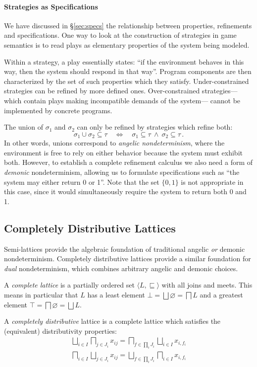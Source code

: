 \documentclass[sigplan,10pt,authordraft]{acmart}
\begin{document}
\paragraph{Strategies as Specifications}

We have discussed in \S\ref{sec:specs}
the relationship between
properties, refinements and specifications.
One way to look at the construction of strategies
in game semantics
is to read plays as elementary properties
of the system being modeled.

Within a strategy,
a play essentially states:
``if the environment behaves in this way,
then the system should respond in that way''.
Program components are then characterized by
the set of such properties which they satisfy.
Under-constrained strategies can be refined by
more defined ones.
Over-constrained strategies---%
which contain plays
making incompatible demands of the system---%
cannot be implemented by concrete programs.

The union of $\sigma_1$ and $\sigma_2$
can only be refined by strategies which refine both:
\[
  \sigma_1 \cup \sigma_2 \subseteq \tau
  \quad\Leftrightarrow\quad
  \sigma_1 \subseteq \tau \:\wedge\:
  \sigma_2 \subseteq \tau
  \,.
\]
In other words,
unions correspond to \emph{angelic nondeterminism},
where the environment is free to rely on either behavior
because the system must exhibit both.
However,
to establish a complete refinement calculus
we also need a form of \emph{demonic} nondeterminism,
allowing us to formulate specifications such as
``the system may either return 0 or 1''.
Note that the set $\{0, 1\}$ is not appropriate in this case,
since it would simultaneously require the system
to return both 0 and 1.


\subsection{Completely Distributive Lattices} %

Semi-lattices provide the algebraic foundation
of traditional angelic \emph{or} demonic nondeterminism.
Completely distributive lattices
provide a similar foundation for
\emph{dual} nondeterminism,
which combines arbitrary angelic and demonic choices.

\begin{definition}
A \emph{complete lattice}
is a partially ordered set $\langle L, {\sqsubseteq} \rangle$
with all joins and meets.
This means in particular that $L$
has a least element $\bot = \bigsqcup \varnothing = \bigsqcap L$
and a greatest element $\top = \bigsqcap \varnothing = \bigsqcup L$.

A \emph{completely distributive} lattice
is a complete lattice which satisfies
the (equivalent) distributivity properties:
\begin{gather} \label{eqn:compdist}
  \bigsqcup_{i \in I} \bigsqcap_{j \in J_i} x_{ij} =
  \bigsqcap_{f \in \prod_i J_i} \bigsqcup_{i \in I} x_{i,f_i}
  \\
  \bigsqcap_{i \in I} \bigsqcup_{j \in J_i} x_{ij} =
  \bigsqcup_{f \in \prod_i J_i} \bigsqcap_{i \in I} x_{i,f_i}
\end{gather}
\end{definition}
\end{document}
